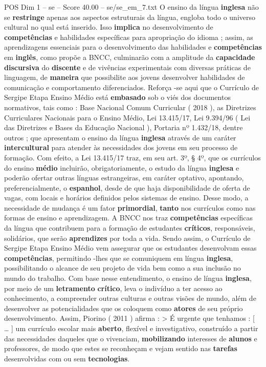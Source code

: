 \begin{textsample}{POS Dim 1 – se – Score 40.00 – se/se\_em\_7.txt}
O ensino da língua \textbf{inglesa} não se \textbf{restringe} apenas aos aspectos estruturais da língua, engloba todo o universo cultural no qual está inserido.
Isso \textbf{implica} no desenvolvimento de \textbf{competências} e habilidades específicas para apropriação do idioma ; assim, as aprendizagens essenciais para o desenvolvimento das habilidades e \textbf{competências} em \textbf{inglês}, como propõe a BNCC, culminarão com a amplitude da \textbf{capacidade} \textbf{discursiva} do \textbf{discente} e de vivências experimentais com diversas práticas de linguagem, de \textbf{maneira} que possibilite aos jovens desenvolver habilidades de comunicação e comportamento diferenciados.
Reforça -se aqui que o Currículo de Sergipe Etapa Ensino Médio está \textbf{embasado} sob o viés dos documentos normativos, tais como : Base Nacional Comum Curricular ( 2018 ), as Diretrizes Curriculares Nacionais para o Ensino Médio, Lei 13.415/17, Lei 9.394/96 ( Lei das Diretrizes e Bases da Educação Nacional ), Portaria nº 1.432/18, dentre outros ; que apresentam o ensino da língua \textbf{inglesa} através de um caráter \textbf{intercultural} para atender às necessidades dos jovens em seu processo de formação.
Com efeito, a Lei 13.415/17 traz, em seu art. 3º, § 4º, que os currículos do ensino \textbf{médio} incluirão, obrigatoriamente, o estudo da língua \textbf{inglesa} e poderão ofertar outras línguas estrangeiras, em caráter optativo, apontando, preferencialmente, o \textbf{espanhol}, desde de que haja disponibilidade de oferta de vagas, com locais e horários definidos pelos sistemas de ensino.
Desse modo, a necessidade de mudança é um fator \textbf{primordial}, \textbf{tanto} nos currículos como nas formas de ensino e aprendizagem.
A BNCC nos traz \textbf{competências} específicas da língua que contribuem para a formação de estudantes \textbf{críticos}, responsáveis, solidários, que serão \textbf{aprendizes} por toda a vida.
Sendo assim, o Currículo de Sergipe Etapa Ensino Médio vem assegurar que os estudantes desenvolvam essas \textbf{competências}, permitindo -lhes que se comuniquem em língua \textbf{inglesa}, possibilitando o alcance de seu projeto de vida bem como a sua inclusão no mundo do trabalho.
Com base nesse entendimento, o ensino de língua \textbf{inglesa}, por meio de um \textbf{letramento} \textbf{crítico}, leva o indivíduo a ter acesso ao conhecimento, a compreender outras culturas e outras visões de mundo, além de desenvolver as potencialidades que os coloquem como \textbf{atores} de seu próprio desenvolvimento.
Assim, Piorino ( 2011 ) afirma : > É urgente que tenhamos : [ … ] um currículo escolar mais \textbf{aberto}, flexível e investigativo, construído a partir das necessidades daqueles que o vivenciam, \textbf{mobilizando} interesses de \textbf{alunos} e professores, de modo que estes se reconheçam e vejam sentido nas \textbf{tarefas} desenvolvidas com ou sem \textbf{tecnologias}.

\end{textsample}
